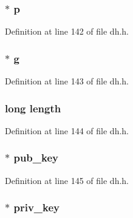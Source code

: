 \subsubsection[{\texorpdfstring{p}{p}}]{ $\ast$ p}\hypertarget{structdh__st_ab39230b0a53cb4326ae76467247959c3}{}\label{structdh__st_ab39230b0a53cb4326ae76467247959c3}


Definition at line 142 of file dh.\+h.

\subsubsection[{\texorpdfstring{g}{g}}]{ $\ast$ g}\hypertarget{structdh__st_a13fc89a0daf188f7de9a2011bc9b051f}{}\label{structdh__st_a13fc89a0daf188f7de9a2011bc9b051f}


Definition at line 143 of file dh.\+h.

\subsubsection[{\texorpdfstring{length}{length}}]{\setlength{\rightskip}{0pt plus 5cm}long length}\hypertarget{structdh__st_ae2b29049fcd8b777a54a1529743b2390}{}\label{structdh__st_ae2b29049fcd8b777a54a1529743b2390}


Definition at line 144 of file dh.\+h.

\subsubsection[{\texorpdfstring{pub\+\_\+key}{pub_key}}]{ $\ast$ pub\+\_\+key}\hypertarget{structdh__st_a7090145c3a15799f21c377097e2a1fd4}{}\label{structdh__st_a7090145c3a15799f21c377097e2a1fd4}


Definition at line 145 of file dh.\+h.

\subsubsection[{\texorpdfstring{priv\+\_\+key}{priv_key}}]{ $\ast$ priv\+\_\+key}\hypertarget{structdh__st_a4f03319697f09215a51fd2d2439cffe9}{}\label{structdh__st_a4f03319697f09215a51fd2d2439cffe9}



